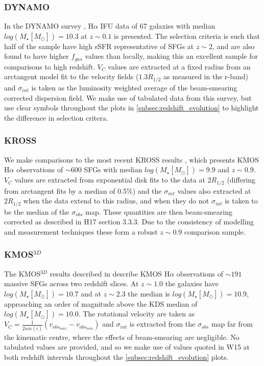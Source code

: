 \documentclass[fleqn,usenatbib]{mn2e}
\begin{document}
\subsubsection{DYNAMO}\label{subsubsec:DYNAMO}
In the DYNAMO survey \citep[G14]{Green2014}, H$\alpha$ IFU data of 67 galaxies with median $log(M_{\star}[M_{\odot}])=10.3$ at $z\sim0.1$ is presented.
The selection criteria is such that half of the sample have high sSFR representative of SFGs at $z\sim 2$, and are also found to have higher $f_{gas}$ values than locally, making this an excellent sample for comparisons to high redshift.
$V_{C}$ values are extracted at a fixed radius from an arctangent model fit to the velocity fields ($1.3R_{1/2}$ as measured in the r-band) and $\sigma_{int}$ is taken as the luminosity weighted average of the beam-smearing corrected dispersion field.
We make use of tabulated data from this survey, but use clear symbols throughout the plots in \cref{subsec:redshift_evolution} to highlight the difference in selection critera.

\subsubsection{KROSS}\label{subsubsec:KROSS}
We make comparisons to the most recent KROSS results \citep[H17]{Harrison2017}, which presents KMOS H$\alpha$ observations of $\sim600$ SFGs with median $log(M_{\star}[M_{\odot}])=9.9$ and $z\sim0.9$.
$V_{C}$ values are extracted from exponential disk fits to the data at $2R_{1/2}$ (differing from arctangent fits by a median of 0.5\%) and the $\sigma_{int}$ values also extracted at $2R_{1/2}$ when the data extend to this radius, and when they do not $\sigma_{int}$ is taken to be the median of the $\sigma_{obs}$ map.
These quantities are then beam-smearing corrected as described in H17 section 3.3.3. 
Due to the consistency of modelling and measurement techniques these form a robust $z\sim0.9$ comparison sample.

\subsubsection{KMOS$^{3D}$}\label{subsubsec:kmos_3d}
The KMOS$^{3D}$ results described in \cite[W15]{Wisnioski2015} describe KMOS H$\alpha$ observations of $\sim191$ massive SFGs across two redshift slices. 
At $z \sim 1.0$ the galaxies have $log(M_{\star}[M_{\odot}])=10.7$ and at $z \sim 2.3$ the median is $log(M_{\star}[M_{\odot}])=10.9$, approaching an order of magnitude above the KDS median of $log(M_{\star}[M_{\odot}])=10.0$.   The rotational velocity are taken as $V_{C} = \frac{1}{2sin(i)}(v_{obs_{max}} - v_{obs_{min}})$ and $\sigma_{int}$ is extracted from the $\sigma_{obs}$ map far from the kinematic centre, where the effects of beam-smearing are negligible.
No tabulated values are provided, and so we make use of values quoted in W15 at both redshift intervals throughout the \cref{subsec:redshift_evolution} plots.
\end{document}

